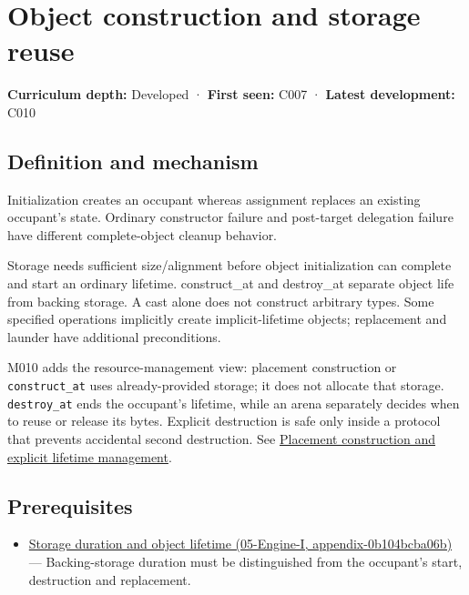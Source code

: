 \hypertarget{appendix-a82f9c438857}{}
\section{Object construction and storage reuse}\label{appendix-a82f9c438857-object-construction-and-storage-reuse}

\textbf{Curriculum depth:} Developed · \textbf{First seen:} C007 · \textbf{Latest development:} C010

\subsection{Definition and mechanism}\label{appendix-a82f9c438857-definition-and-mechanism}

Initialization creates an occupant whereas assignment replaces an existing occupant's state. Ordinary constructor failure and post-target delegation failure have different complete-object cleanup behavior.

Storage needs sufficient size/alignment before object initialization can complete and start an ordinary lifetime. construct\_at and destroy\_at separate object life from backing storage. A cast alone does not construct arbitrary types. Some specified operations implicitly create implicit-lifetime objects; replacement and launder have additional preconditions.

M010 adds the resource-management view: placement construction or \texttt{construct\_at} uses already-provided storage; it does not allocate that storage. \texttt{destroy\_at} ends the occupant's lifetime, while an arena separately decides when to reuse or release its bytes. Explicit destruction is safe only inside a protocol that prevents accidental second destruction. See \hyperref[appendix-f56c3e43fd4e]{Placement construction and explicit lifetime management}.

\subsection{Prerequisites}\label{appendix-a82f9c438857-prerequisites}

\begin{itemize}
\tightlist
\item
  \href{../05-Engine-I/main.pdf\#nameddest=appendix-0b104bcba06b}{Storage duration and object lifetime (05-Engine-I, appendix-0b104bcba06b)} --- Backing-storage duration must be distinguished from the occupant's start, destruction and replacement.
\end{itemize}

